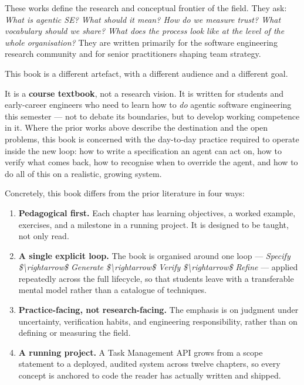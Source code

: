 \documentclass[11pt,a4paper]{book}
\begin{document}
These works define the research and conceptual frontier of the field. They ask: \textit{What is agentic SE? What should it mean? How do we measure trust? What vocabulary should we share? What does the process look like at the level of the whole organisation?} They are written primarily for the software engineering research community and for senior practitioners shaping team strategy.

This book is a different artefact, with a different audience and a different goal.

It is a \textbf{course textbook}, not a research vision. It is written for students and early-career engineers who need to learn how to \textit{do} agentic software engineering this semester --- not to debate its boundaries, but to develop working competence in it. Where the prior works above describe the destination and the open problems, this book is concerned with the day-to-day practice required to operate inside the new loop: how to write a specification an agent can act on, how to verify what comes back, how to recognise when to override the agent, and how to do all of this on a realistic, growing system.

Concretely, this book differs from the prior literature in four ways:

\begin{enumerate}
  \item \textbf{Pedagogical first.} Each chapter has learning objectives, a worked example, exercises, and a milestone in a running project. It is designed to be taught, not only read.
  \item \textbf{A single explicit loop.} The book is organised around one loop --- \textit{Specify \$\textbackslash{}rightarrow\$ Generate \$\textbackslash{}rightarrow\$ Verify \$\textbackslash{}rightarrow\$ Refine} --- applied repeatedly across the full lifecycle, so that students leave with a transferable mental model rather than a catalogue of techniques.
  \item \textbf{Practice-facing, not research-facing.} The emphasis is on judgment under uncertainty, verification habits, and engineering responsibility, rather than on defining or measuring the field.
  \item \textbf{A running project.} A Task Management API grows from a scope statement to a deployed, audited system across twelve chapters, so every concept is anchored to code the reader has actually written and shipped.
\end{enumerate}
\end{document}
